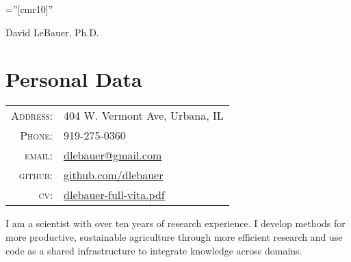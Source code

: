 \documentclass[a4paper,10pt]{article}
\begin{document}

\pagestyle{empty} %

\font\fb=''[cmr10]'' %

\par{\centering
		{\Huge David LeBauer, Ph.D.
	}\bigskip\par}

\section{Personal Data}

\begin{tabular}{rl}
    \textsc{Address:}   & 404 W. Vermont Ave, Urbana, IL \\
    \textsc{Phone:}     & 919-275-0360\\
    \textsc{email:}     &   
        \href{mailto:dlebauer@gmail.com}{dlebauer@gmail.com}\\
    \textsc{github:}    &     
        \href{https://github.com/dlebauer}{github.com/dlebauer}\\
    \textsc{cv:}        &
        \href{https://github.com/dlebauer/vita/raw/master/dlebauer-full-vita.pdf}{dlebauer-full-vita.pdf}

\end{tabular}

I am a scientist with over ten years of research experience. I develop methods for more productive, sustainable agriculture through more efficient research and use code as a shared infrastructure to integrate knowledge across domains.
\end{document}
